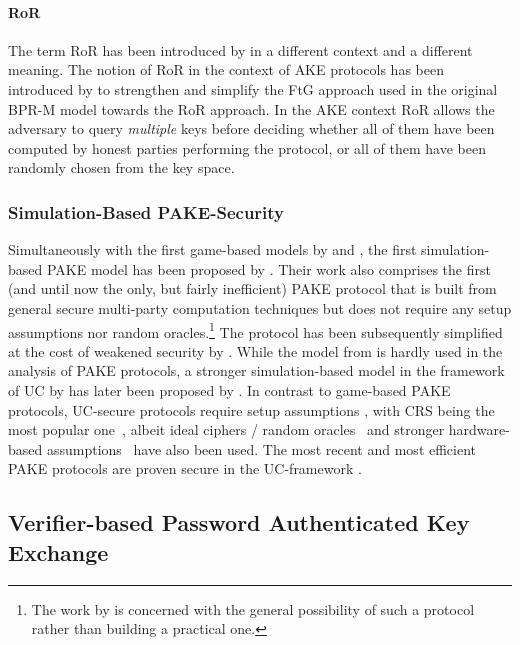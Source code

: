 \paragraph{\acl{RoR}}
The term \acl{RoR} has been introduced by \citet{Bellare97} in a different context and a different meaning.
The notion of \ac{RoR} in the context of \acl{AKE} protocols has been introduced by \citet{Abdalla2005} to strengthen and simplify the \ac{FtG} approach used in the original \ac{BPR-M} model towards the \ac{RoR} approach.
In the \ac{AKE} context \ac{RoR} allows the adversary to query \emph{multiple} keys before deciding whether all of them have been computed by honest parties performing the protocol, or all of them  have been randomly chosen from the key space.

\subsubsection{Simulation-Based PAKE-Security}
Simultaneously with the first game-based models by \citet{Bellare2000} and \citet{Boyko2000}, the first simulation-based \ac{PAKE} model has been proposed by \citet{Goldreich01}.
Their work also comprises the first (and until now the only, but fairly inefficient) \ac{PAKE} protocol that is built from general secure multi-party computation techniques but does not require any setup assumptions nor random oracles.\footnote{The work by \citet{Goldreich01} is concerned with the general possibility of such a protocol rather than building a practical one.}
The protocol has been subsequently simplified at the cost of weakened security by \citet{NguyenV04}.
While the model from \citet{Goldreich01} is hardly used in the analysis of \ac{PAKE} protocols, a stronger simulation-based model in the framework of \acl{UC} by  \citet{Canetti2001a} has later been proposed by \citet{Canetti2005}.
In contrast to game-based \ac{PAKE} protocols, \ac{UC}-secure protocols require setup assumptions \cite{Canetti2005}, with \ac{CRS} being the most popular one~\cite{Katz2011}, albeit ideal ciphers / random oracles~\cite{Abdalla2008} and stronger hardware-based assumptions~\cite{cryptoeprint:2012:537} have also been used.
The most recent and most efficient \ac{PAKE} protocols are proven secure in the \ac{UC}-framework \cite{Benhamouda2013,AbdallaBBCP13,AbdallaBP14a,AbdallaBP15}.

\subsection{Verifier-based Password Authenticated Key Exchange}\label{sec:intro:verifier-basedPAKE}

